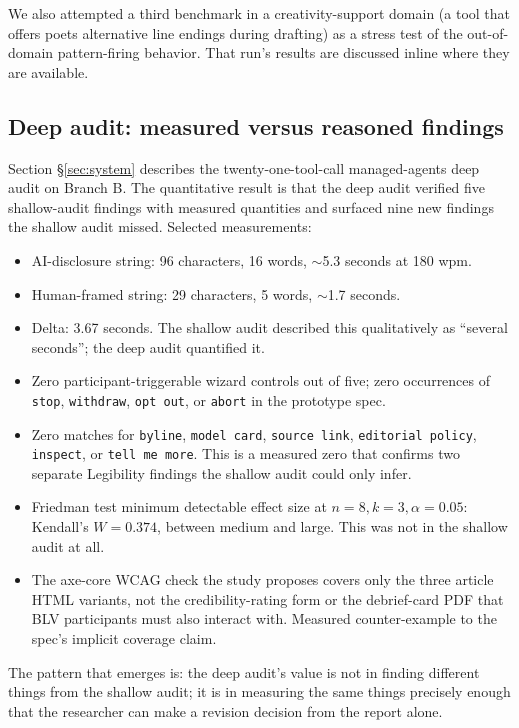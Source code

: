 We also attempted a third benchmark in a creativity-support domain (a tool that offers poets alternative line endings during drafting) as a stress test of the out-of-domain pattern-firing behavior. That run's results are discussed inline where they are available.

\subsection{Deep audit: measured versus reasoned findings}

Section \S\ref{sec:system} describes the twenty-one-tool-call managed-agents deep audit on Branch B. The quantitative result is that the deep audit verified five shallow-audit findings with measured quantities and surfaced nine new findings the shallow audit missed. Selected measurements:

\begin{itemize}
    \item AI-disclosure string: 96 characters, 16 words, $\sim$5.3 seconds at 180 wpm.
    \item Human-framed string: 29 characters, 5 words, $\sim$1.7 seconds.
    \item Delta: 3.67 seconds. The shallow audit described this qualitatively as ``several seconds''; the deep audit quantified it.
    \item Zero participant-triggerable wizard controls out of five; zero occurrences of \texttt{stop}, \texttt{withdraw}, \texttt{opt out}, or \texttt{abort} in the prototype spec.
    \item Zero matches for \texttt{byline}, \texttt{model card}, \texttt{source link}, \texttt{editorial policy}, \texttt{inspect}, or \texttt{tell me more}. This is a measured zero that confirms two separate Legibility findings the shallow audit could only infer.
    \item Friedman test minimum detectable effect size at $n=8, k=3, \alpha=0.05$: Kendall's $W = 0.374$, between medium and large. This was not in the shallow audit at all.
    \item The axe-core WCAG check the study proposes covers only the three article HTML variants, not the credibility-rating form or the debrief-card PDF that BLV participants must also interact with. Measured counter-example to the spec's implicit coverage claim.
\end{itemize}

The pattern that emerges is: the deep audit's value is not in finding different things from the shallow audit; it is in measuring the same things precisely enough that the researcher can make a revision decision from the report alone.
